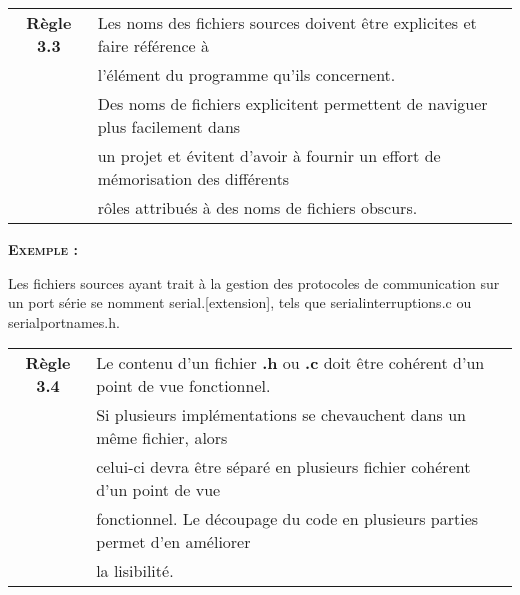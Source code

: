 \medskip

\begin{center}
\begin{tabular}{|c l|}
\hline
\rowcolor{red!10}\textbf{Règle 3.3} & Les noms des fichiers sources doivent être explicites et faire référence à \\
\rowcolor{red!10} & l'élément du programme qu'ils concernent.\\ \hline
 & Des noms de fichiers explicitent permettent de naviguer plus facilement dans \\
 & un projet et évitent d'avoir à fournir un effort de mémorisation des différents \\
 & rôles attribués à des noms de fichiers obscurs.\\ \hline
\hline
\end{tabular}
\end{center}

\smallskip
\begin{large}
\textbf{\textsc{Exemple :}}
\end{large}
Les fichiers sources ayant trait à la gestion des protocoles de communication sur un port série se nomment {\selectfont serial.[extension]}, tels que {\selectfont serial\textunderscore interruptions.c} ou {\selectfont serial\textunderscore port\textunderscore names.h}.

\medskip

\begin{center}
\begin{tabular}{|c l|}
\hline
\rowcolor{red!10}\textbf{Règle 3.4} & Le contenu d'un fichier \textbf{.h} ou \textbf{.c} doit être cohérent d'un point de vue fonctionnel.\\
 & Si plusieurs implémentations se chevauchent dans un même fichier, alors \\
 & celui-ci devra être séparé en plusieurs fichier cohérent d'un point de vue \\
 & fonctionnel. Le découpage du code en plusieurs parties permet d'en améliorer \\
 & la lisibilité. \\ \hline
\hline
\end{tabular}
\end{center}

\medskip

